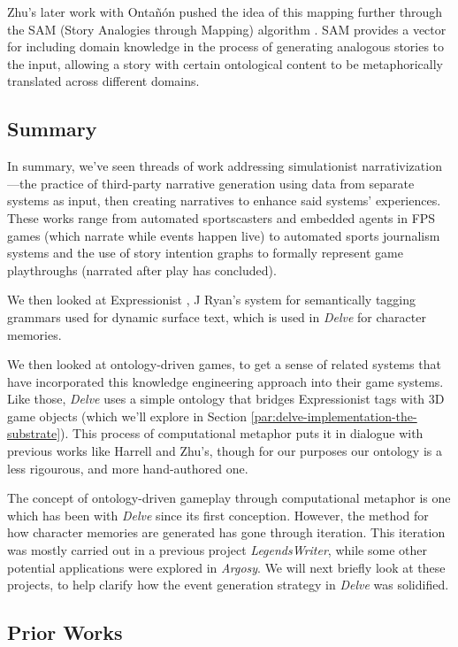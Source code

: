 Zhu’s later work with Ontañón pushed the idea of this mapping further through the SAM (Story Analogies through Mapping) algorithm \cite{ontanon2011sam}. SAM provides a vector for including domain knowledge in the process of generating analogous stories to the input, allowing a story with certain ontological content to be metaphorically translated across different domains.

\subsection{Summary}\label{devel-related-summary}

In summary, we've seen threads of work addressing simulationist narrativization---the practice of third-party narrative generation using data from separate systems as input, then creating narratives to enhance said systems' experiences. These works range from automated sportscasters and embedded agents in FPS games (which narrate while events happen live) to automated sports journalism systems and the use of story intention graphs to formally represent game playthroughs (narrated after play has concluded).

We then looked at Expressionist \cite{ryan2016expressionist}, J Ryan's system for semantically tagging grammars used for dynamic surface text, which is used in \textit{Delve} for character memories.

We then looked at ontology-driven games, to get a sense of related systems that have incorporated this knowledge engineering approach into their game systems. Like those, \textit{Delve} uses a simple ontology that bridges Expressionist tags with 3D game objects (which we'll explore in Section \ref{par:delve-implementation-the-substrate}). This process of computational metaphor puts it in dialogue with previous works like Harrell and Zhu's, though for our purposes our ontology is a less rigourous, and more hand-authored one.

The concept of ontology-driven gameplay through computational metaphor is one which has been with \textit{Delve} since its first conception. However, the method for how character memories are generated has gone through iteration. This iteration was mostly carried out in a previous project \textit{LegendsWriter}, while some other potential applications were explored in \textit{Argosy}. We will next briefly look at these projects, to help clarify how the event generation strategy in \textit{Delve} was solidified.

\subsection{Prior Works}\label{subsec:delve-prior-works}

